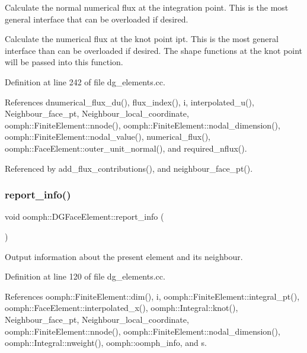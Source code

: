 Calculate the normal numerical flux at the integration point. This is the most general interface that can be overloaded if desired. 

Calculate the numerical flux at the knot point ipt. This is the most general interface than can be overloaded if desired. The shape functions at the knot point will be passed into this function. 

Definition at line 242 of file dg\+\_\+elements.\+cc.



References dnumerical\+\_\+flux\+\_\+du(), flux\+\_\+index(), i, interpolated\+\_\+u(), Neighbour\+\_\+face\+\_\+pt, Neighbour\+\_\+local\+\_\+coordinate, oomph\+::\+Finite\+Element\+::nnode(), oomph\+::\+Finite\+Element\+::nodal\+\_\+dimension(), oomph\+::\+Finite\+Element\+::nodal\+\_\+value(), numerical\+\_\+flux(), oomph\+::\+Face\+Element\+::outer\+\_\+unit\+\_\+normal(), and required\+\_\+nflux().



Referenced by add\+\_\+flux\+\_\+contributions(), and neighbour\+\_\+face\+\_\+pt().

\mbox{\label{classoomph_1_1DGFaceElement_a2a0dd5c6307080b580fc696a8b65fb0e}} 
\subsubsection{\texorpdfstring{report\+\_\+info()}{report\_info()}}
{\footnotesize\ttfamily void oomph\+::\+D\+G\+Face\+Element\+::report\+\_\+info (\begin{DoxyParamCaption}{ }\end{DoxyParamCaption})}



Output information about the present element and its neighbour. 



Definition at line 120 of file dg\+\_\+elements.\+cc.



References oomph\+::\+Finite\+Element\+::dim(), i, oomph\+::\+Finite\+Element\+::integral\+\_\+pt(), oomph\+::\+Face\+Element\+::interpolated\+\_\+x(), oomph\+::\+Integral\+::knot(), Neighbour\+\_\+face\+\_\+pt, Neighbour\+\_\+local\+\_\+coordinate, oomph\+::\+Finite\+Element\+::nnode(), oomph\+::\+Finite\+Element\+::nodal\+\_\+dimension(), oomph\+::\+Integral\+::nweight(), oomph\+::oomph\+\_\+info, and s.



